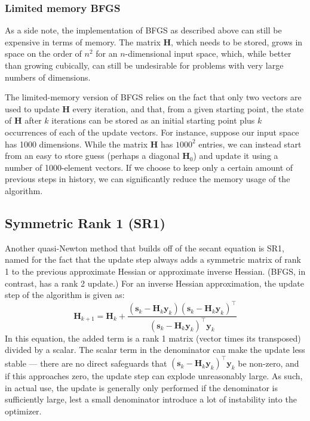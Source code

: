 \documentclass[12pt]{article}
\begin{document}
\subsubsection{Limited memory BFGS}

As a side note, the implementation of BFGS as described above can still be expensive in terms of memory.
The matrix \(\mathbf{H}\), which needs to be stored, grows in space on the order of \(n^2\) for an \(n\)-dimensional input space,
which, while better than growing cubically, can still be undesirable for problems with very large numbers of dimensions.

The limited-memory version of BFGS relies on the fact that only two vectors are used to update \(\mathbf{H}\) every iteration,
and that, from a given starting point, the state of \(\mathbf{H}\) after \(k\) iterations can be stored as an initial starting point plus
\(k\) occurrences of each of the update vectors. For instance, suppose our input space has 1000 dimensions. While the matrix \(\mathbf{H}\)
has \(1000^2\) entries, we can instead start from an easy to store guess (perhaps a diagonal \(\mathbf{H}_0\)) and update it using a number of
1000-element vectors. If we choose to keep only a certain amount of previous steps in history, we can significantly reduce the 
memory usage of the algorithm. 

\subsection{Symmetric Rank 1 (SR1)}

Another quasi-Newton method that builds off of the secant equation is SR1, named for the fact that the update step
always adds a symmetric matrix of rank 1 to the previous approximate Hessian or approximate inverse Hessian. (BFGS,
in contrast, has a rank 2 update.) For an inverse Hessian approximation, the update step of the algorithm is given as:
\[\mathbf{H}_{k+1} = \mathbf{H}_k + \frac{(\mathbf{s}_k - \mathbf{H}_k \mathbf{y}_k)(\mathbf{s}_k - \mathbf{H}_k \mathbf{y}_k
)^\top}{(\mathbf{s}_k - \mathbf{H}_k \mathbf{y}_k)^\top \mathbf{y}_k}\]
In this equation, the added term is a rank 1 matrix (vector times its transposed) divided by a scalar. The scalar term
in the denominator can make the update less stable --- there are no direct safeguards that 
\((\mathbf{s}_k - \mathbf{H}_k \mathbf{y}_k)^\top \mathbf{y}_k\) be non-zero, and if this approaches zero, the update 
step can explode unreasonably large. As such, in actual use, the update is generally only performed if the denominator is 
sufficiently large, lest a small denominator introduce a lot of instability into the optimizer. 
\end{document}
